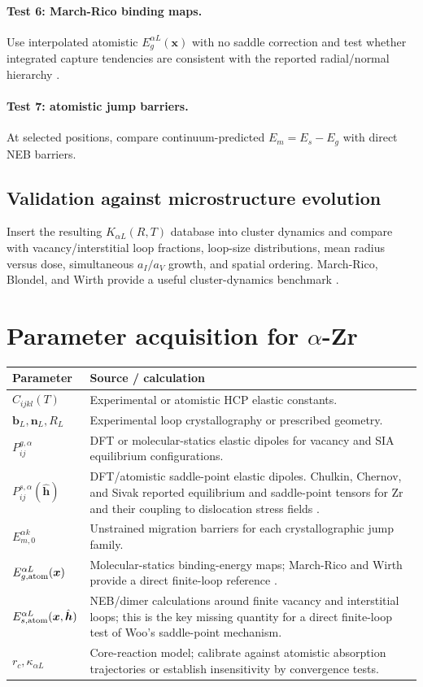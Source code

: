 \documentclass[11pt]{article}
\newcommand{\bx}{\bm{x}}
\newcommand{\bh}{\bm{h}}
\newcommand{\bn}{\bm{n}}
\newcommand{\bb}{\bm{b}}
\begin{document}
\paragraph{Test 6: March-Rico binding maps.}
Use interpolated atomistic $E_g^{\alpha L}(\bx)$ with no saddle correction and test whether integrated capture tendencies are consistent with the reported radial/normal hierarchy \cite{MarchRicoWirth2023}.

\paragraph{Test 7: atomistic jump barriers.}
At selected positions, compare continuum-predicted $E_m=E_s-E_g$ with direct NEB barriers.

\subsection{Validation against microstructure evolution}
Insert the resulting $K_{\alpha L}(R,T)$ database into cluster dynamics and compare with vacancy/interstitial loop fractions, loop-size distributions, mean radius versus dose, simultaneous $a_I/a_V$ growth, and spatial ordering. March-Rico, Blondel, and Wirth provide a useful cluster-dynamics benchmark \cite{MarchRicoBlondelWirth2025}.

\section{Parameter acquisition for $\alpha$-Zr}
\begin{longtable}{p{}p{}}
\toprule
\textbf{Parameter} & \textbf{Source / calculation}\\
\midrule
\endhead
$C_{ijkl}(T)$ & Experimental or atomistic HCP elastic constants.\\
$\bb_L,\bn_L,R_L$ & Experimental loop crystallography or prescribed geometry.\\
$P_{ij}^{g,\alpha}$ & DFT or molecular-statics elastic dipoles for vacancy and SIA equilibrium configurations.\\
$P_{ij}^{s,\alpha}(\hat{\bh})$ & DFT/atomistic saddle-point elastic dipoles. Chulkin, Chernov, and Sivak reported equilibrium and saddle-point tensors for Zr and their coupling to dislocation stress fields \cite{Chulkin2008}.\\
$E_{m,0}^{\alpha k}$ & Unstrained migration barriers for each crystallographic jump family.\\
$E_{g,\rm atom}^{\alpha L}(\bx)$ & Molecular-statics binding-energy maps; March-Rico and Wirth provide a direct finite-loop reference \cite{MarchRicoWirth2023}.\\
$E_{s,\rm atom}^{\alpha L}(\bx,\hat{\bh})$ & NEB/dimer calculations around finite vacancy and interstitial loops; this is the key missing quantity for a direct finite-loop test of Woo's saddle-point mechanism.\\
$r_c,\kappa_{\alpha L}$ & Core-reaction model; calibrate against atomistic absorption trajectories or establish insensitivity by convergence tests.\\
\bottomrule
\end{longtable}
\end{document}
